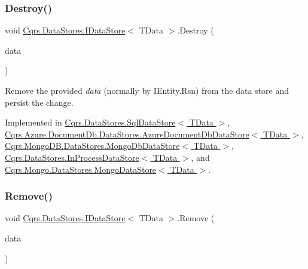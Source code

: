 \subsubsection{\texorpdfstring{Destroy()}{Destroy()}}
{\footnotesize\ttfamily void \hyperlink{interfaceCqrs_1_1DataStores_1_1IDataStore}{Cqrs.\+Data\+Stores.\+I\+Data\+Store}$<$ T\+Data $>$.Destroy (\begin{DoxyParamCaption}\item[{T\+Data}]{data }\end{DoxyParamCaption})}



Remove the provided {\itshape data}  (normally by I\+Entity.\+Rsn) from the data store and persist the change. 



Implemented in \hyperlink{classCqrs_1_1DataStores_1_1SqlDataStore_a5ec396c9eb202c8de931c1546c721ca3}{Cqrs.\+Data\+Stores.\+Sql\+Data\+Store$<$ T\+Data $>$}, \hyperlink{classCqrs_1_1Azure_1_1DocumentDb_1_1DataStores_1_1AzureDocumentDbDataStore_affe39fe57e590555256258fa6c568c29}{Cqrs.\+Azure.\+Document\+Db.\+Data\+Stores.\+Azure\+Document\+Db\+Data\+Store$<$ T\+Data $>$}, \hyperlink{classCqrs_1_1MongoDB_1_1DataStores_1_1MongoDbDataStore_a4650c780f34e320ba39f312e3b04555d}{Cqrs.\+Mongo\+D\+B.\+Data\+Stores.\+Mongo\+Db\+Data\+Store$<$ T\+Data $>$}, \hyperlink{classCqrs_1_1DataStores_1_1InProcessDataStore_a1fc7a3935f52087f3703b652e77f0b75}{Cqrs.\+Data\+Stores.\+In\+Process\+Data\+Store$<$ T\+Data $>$}, and \hyperlink{classCqrs_1_1Mongo_1_1DataStores_1_1MongoDataStore_af97319aef1f0484666d9ea12578b8df9}{Cqrs.\+Mongo.\+Data\+Stores.\+Mongo\+Data\+Store$<$ T\+Data $>$}.

\mbox{\label{interfaceCqrs_1_1DataStores_1_1IDataStore_a7ef540796bbe4257296841590bc23478}} 
\subsubsection{\texorpdfstring{Remove()}{Remove()}}
{\footnotesize\ttfamily void \hyperlink{interfaceCqrs_1_1DataStores_1_1IDataStore}{Cqrs.\+Data\+Stores.\+I\+Data\+Store}$<$ T\+Data $>$.Remove (\begin{DoxyParamCaption}\item[{T\+Data}]{data }\end{DoxyParamCaption})}



